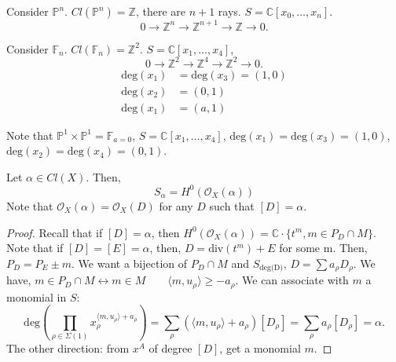\documentclass[a4paper,12pt]{amsart}
\begin{document}
\begin{example}
	Consider $\mathbb{P}^n$. $Cl(\mathbb{P}^n)=\mathbb{Z}$, there are $n+1$ rays. $S = \mathbb{C}[x_0,\dotsc,x_n]$.
	\begin{equation}
		0 \rightarrow \mathbb{Z}^n \rightarrow \mathbb{Z}^{n+1} \rightarrow \mathbb{Z} \rightarrow 0.
	\end{equation}
\end{example}
\begin{example}
	Consider $\mathbb{F}_n$. $Cl(\mathbb{F}_n)=\mathbb{Z}^2$. $S=\mathbb{C}[x_1,\dotsc,x_4]$,
	\begin{equation}
	0 \rightarrow \mathbb{Z}^2 \rightarrow \mathbb{Z}^{4} \rightarrow \mathbb{Z}^2 \rightarrow 0.
	\end{equation}
	\begin{equation}
		\begin{aligned}
		\text{deg}(x_1) &= \text{deg}(x_3) = (1,0)\\
		\text{deg}(x_2) &= (0,1)\\
		\text{deg}(x_1) &= (a,1)
		\end{aligned}
	\end{equation}
\end{example}
Note that $\mathbb{P}^1 \times \mathbb{P}^1 = \mathbb{F}_{a=0}$, $S=\mathbb{C}[x_1,\dotsc,x_4]$, $\text{deg}(x_1) = \text{deg}(x_3) = (1,0)$, $\text{deg}(x_2) = \text{deg}(x_4) = (0,1)$.
\begin{proposition}
	Let $\alpha \in Cl(X)$. Then,
	\begin{equation}
		S_\alpha = H^0(\mathcal{O}_X(\alpha))
	\end{equation}
	Note that $\mathcal{O}_X(\alpha) = \mathcal{O}_X(D)$ for any $D$ such that $[D]=\alpha$.
\end{proposition}
\begin{proof}
	Recall that if $[D]=\alpha$, then $H^0(\mathcal{O}_X(\alpha))=\mathbb{C}\cdot \{ t^m, m \in P_D \cap M \}$.
	Note that if $[D]=[E]=\alpha$, then, $D = \text{div}(t^m)+E$ for some m. Then, $P_D = P_E \pm m$.
	We want a bijection of $P_D \cap M$ and $S_{\text{deg(D)}}$, $D = \sum a_\rho D_\rho$. We have, $m \in P_D \cap M \leftrightarrow m\in M \qquad \langle m, u_\rho \rangle \geq -a_\rho$. We can associate with $m$ a monomial in $S$:
	\begin{equation}
		\text{deg}(\prod_{\rho \in \Sigma(1)} x_\rho^{\langle m, u_\rho \rangle + a_\rho}) = \sum_\rho (\langle m,u_\rho \rangle + a_\rho)[D_\rho] = \sum_\rho a_\rho [D_\rho] = \alpha.
	\end{equation}
	The other direction: from $x^A$ of degree $[D]$, get a monomial $m$.
\end{proof}
\end{document}

